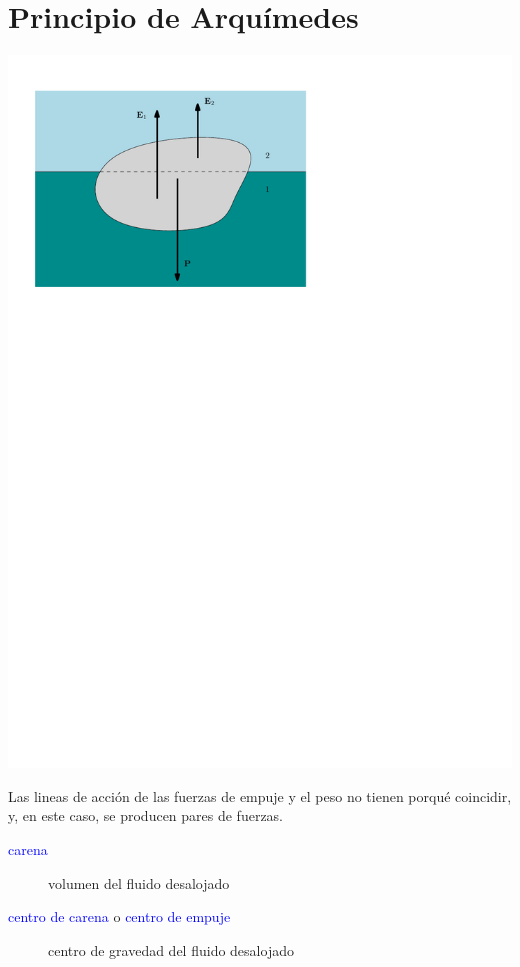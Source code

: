 \section{Principio de Arquímedes}



\begin{minipage}{0.4\textwidth}
	\begin{center}
		\includegraphics[width=\textwidth]{TeX_files/chapter02-Hidrostatica/arquimedes}
	\end{center}
\end{minipage}
\begin{minipage}{0.5\textwidth}
	Las lineas de acción de las fuerzas de empuje y el peso no
	tienen porqué coincidir, y, en este caso, se producen pares de fuerzas.
	\begin{description}
		\item[\textcolor{blue}{carena}] volumen del fluido desalojado
		\item[\textcolor{blue}{centro
			de carena} o \textcolor{blue}{centro de empuje}] centro de gravedad del fluido desalojado
	\end{description}
\end{minipage}



